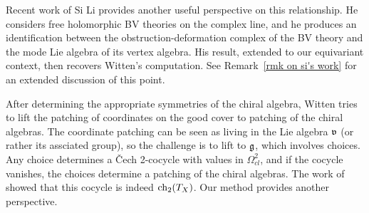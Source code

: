 \begin{rmk}
Recent work  \cite{LiQME} of Si Li provides another useful perspective on this relationship. 
He considers free holomorphic BV theories on the complex line,
and he produces an identification between the obstruction-deformation complex of the BV theory and the mode Lie algebra of its vertex algebra.
His result, extended to our equivariant context, then recovers Witten's computation. 
See Remark~\ref{rmk on si's work} for an extended discussion of this point.
\end{rmk}

After determining the appropriate symmetries of the chiral algebra, 
Witten tries to lift the patching of coordinates on the good cover to patching of the chiral algebras.
The coordinate patching can be seen as living in the Lie algebra $\frak{v}$ (or rather its assciated group),
so the challenge is to lift to $\mathfrak g$, which involves choices.
Any choice determines a \v{C}ech 2-cocycle with values in $\Omega^2_{cl}$,
and if the cocycle vanishes,
the choices determine a patching of the chiral algebras.
The work of \cite{GMS} showed that this cocycle is indeed ${\rm ch}_2(T_X)$.
Our method provides another perspective.

